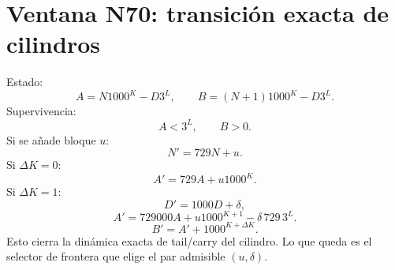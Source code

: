 
\section*{Ventana N70: transición exacta de cilindros}
Estado:
\[
A=N1000^K-D3^L,
\qquad
B=(N+1)1000^K-D3^L.
\]
Supervivencia:
\[
\boxed{A<3^L,\qquad B>0.}
\]
Si se añade bloque \(u\):
\[
N'=729N+u.
\]
Si \(\Delta K=0\):
\[
\boxed{A'=729A+u1000^K.}
\]
Si \(\Delta K=1\):
\[
D'=1000D+\delta,
\]
\[
\boxed{A'=729000A+u1000^{K+1}-\delta\,729\,3^L.}
\]
\[
\boxed{B'=A'+1000^{K+\Delta K}.}
\]
Esto cierra la dinámica exacta de tail/carry del cilindro. Lo que queda es el selector de frontera que elige el par admisible \((u,\delta)\).
